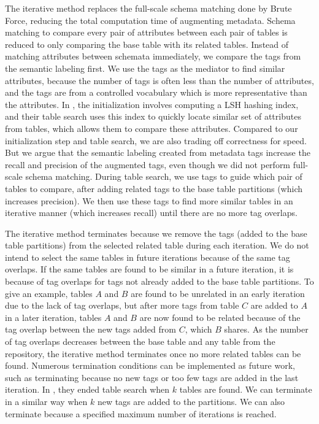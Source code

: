 The iterative method replaces the full-scale schema matching done by Brute Force, reducing the total computation time of augmenting metadata. Schema matching to compare every pair of attributes between each pair of tables is reduced to only comparing the base table with its related tables. Instead of matching attributes between schemata immediately, we compare the tags from the semantic labeling first. We use the tags as the mediator to find similar attributes, because the number of tags is often less than the number of attributes, and the tags are from a controlled vocabulary which is more representative than the attributes. In \cite{Moawed2018Arabian}, the initialization involves computing a LSH hashing index, and their table search uses this index to quickly locate similar set of attributes from tables, which allows them to compare these attributes. Compared to our initialization step and table search, we are also trading off correctness for speed. But we argue that the semantic labeling created from metadata tags increase the recall and precision of the augmented tags, even though we did not perform full-scale schema matching. During table search, we use tags to guide which pair of tables to compare, after adding related tags to the base table partitions (which increases precision). We then use these tags to find more similar tables in an iterative manner (which increases recall) until there are no more tag overlaps.

The iterative method terminates because we remove the tags (added to the base table partitions) from the selected related table during each iteration. We do not intend to select the same tables in future iterations because of the same tag overlaps. If the same tables are found to be similar in a future iteration, it is because of tag overlaps for tags not already added to the base table partitions. To give an example, tables $A$ and $B$ are found to be unrelated in an early iteration due to the lack of tag overlaps, but after more tags from table $C$ are added to $A$ in a later iteration, tables $A$ and $B$ are now found to be related because of the tag overlap between the new tags added from $C$, which $B$ shares. As the number of tag overlaps decreases between the base table and any table from the repository, the iterative method terminates once no more related tables can be found. Numerous termination conditions can be implemented as future work, such as terminating because no new tags or too few tags are added in the last iteration. In \cite{Nargesian2018Table}, they ended table search when $k$ tables are found. We can terminate in a similar way when $k$ new tags are added to the partitions. We can also terminate because a specified maximum number of iterations is reached.

